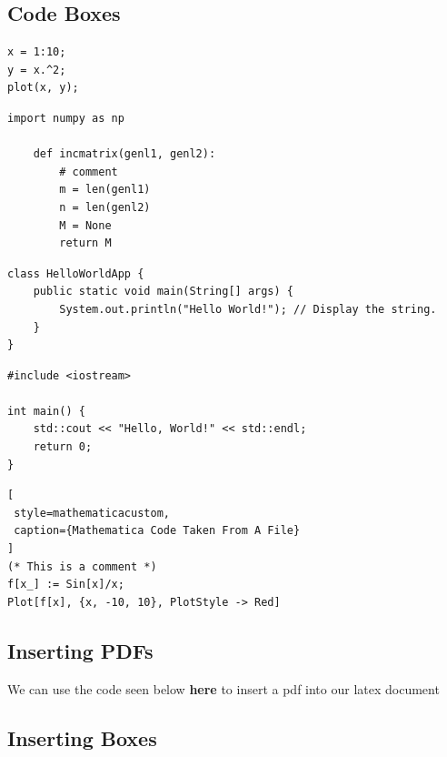\subsection{Code Boxes}

\begin{lstlisting}[style=matlabcustom, caption={Example MATLAB code}]
x = 1:10;
y = x.^2;
plot(x, y);
\end{lstlisting}

\begin{lstlisting}[style=pythoncustom, caption={Python example}]
    import numpy as np
    
    def incmatrix(genl1, genl2):
        # comment
        m = len(genl1)
        n = len(genl2)
        M = None
        return M
\end{lstlisting}

\begin{lstlisting}[style=javacustom, caption={Java example}]
class HelloWorldApp {
    public static void main(String[] args) {
        System.out.println("Hello World!"); // Display the string.
    }
}
\end{lstlisting}

\begin{lstlisting}[style=cppcustom, caption={C++ example}]
#include <iostream>

int main() {
    std::cout << "Hello, World!" << std::endl;
    return 0;
}
\end{lstlisting}

\begin{lstlisting}[
 style=mathematicacustom,
 caption={Mathematica Code Taken From A File}
]
(* This is a comment *)
f[x_] := Sin[x]/x;
Plot[f[x], {x, -10, 10}, PlotStyle -> Red]
\end{lstlisting}




\subsection{Inserting PDFs}

We can use the code seen below \textbf{here} to insert a pdf into our latex document



\subsection{Inserting Boxes}

